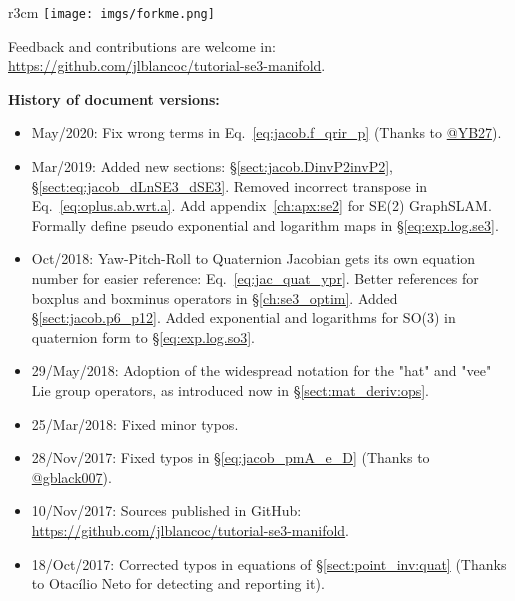 \documentclass[a4paper,11pt]{report}
\begin{document}
\newpage

\begin{wrapfigure}{r}{3cm}
    \texttt{[image: imgs/forkme.png]}
\end{wrapfigure}

Feedback and contributions are welcome in: \\
\url{https://github.com/jlblancoc/tutorial-se3-manifold}.

\vspace{2cm}

\textbf{History of document versions:}
\begin{itemize}
 \item May/2020: Fix wrong terms in Eq.~\ref{eq:jacob.f_qrir_p} (Thanks to \href{https://github.com/YB27}{@YB27}).

 \item Mar/2019: Added new sections: \S\ref{sect:jacob.DinvP2invP2}, \S\ref{sect:eq:jacob_dLnSE3_dSE3}. Removed incorrect transpose in Eq.~\ref{eq:oplus.ab.wrt.a}. Add appendix~\ref{ch:apx:se2} for SE(2) GraphSLAM. Formally define pseudo exponential and logarithm maps in \S\ref{eq:exp.log.se3}.

 \item Oct/2018: Yaw-Pitch-Roll to Quaternion Jacobian gets its own equation number for easier reference: Eq.~\ref{eq:jac_quat_ypr}. Better references for boxplus and boxminus operators in \S\ref{ch:se3_optim}. Added \S\ref{sect:jacob.p6_p12}. Added exponential and logarithms for SO(3) in quaternion form to \S\ref{eq:exp.log.so3}.
	
 \item 29/May/2018: Adoption of the widespread notation for the "hat" and "vee" Lie group operators, as introduced now in \S\ref{sect:mat_deriv:ops}.

 \item 25/Mar/2018: Fixed minor typos.
  
 \item 28/Nov/2017: Fixed typos in \S\ref{eq:jacob_pmA_e_D} (Thanks to \href{https://github.com/gblack007}{@gblack007}).

 \item 10/Nov/2017: Sources published in GitHub: \\
    \url{https://github.com/jlblancoc/tutorial-se3-manifold}.

 \item 18/Oct/2017: Corrected typos in equations of \S\ref{sect:point_inv:quat} (Thanks to Otacílio Neto for detecting and reporting it).


\end{itemize}
\end{document}
